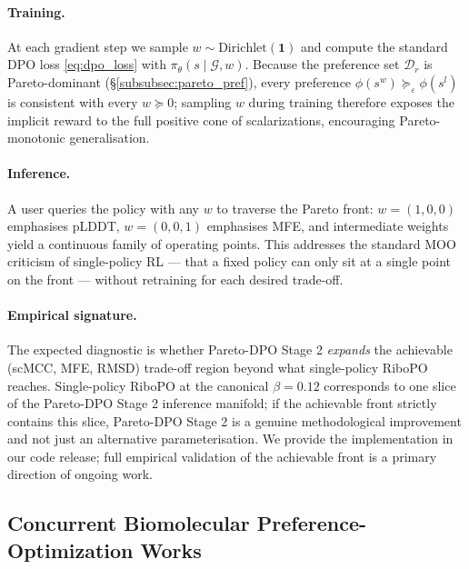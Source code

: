 {{\paragraph{Training.}
At each gradient step we sample $w \sim \mathrm{Dirichlet}(\mathbf{1})$ and compute the standard DPO loss \eqref{eq:dpo_loss} with $\pi_\theta(s\mid \mathcal{G}, w)$. Because the preference set $\mathcal{D}_r$ is Pareto-dominant (\S\ref{subsubsec:pareto_pref}), every preference $\phi(s^w) \succeq_\varepsilon \phi(s^l)$ is consistent with every $w \succeq 0$; sampling $w$ during training therefore exposes the implicit reward to the full positive cone of scalarizations, encouraging Pareto-monotonic generalisation.

\paragraph{Inference.}
A user queries the policy with any $w$ to traverse the Pareto front: $w = (1,0,0)$ emphasises pLDDT, $w = (0,0,1)$ emphasises MFE, and intermediate weights yield a continuous family of operating points. This addresses the standard MOO criticism of single-policy RL --- that a fixed policy can only sit at a single point on the front --- without retraining for each desired trade-off.

\paragraph{Empirical signature.}
The expected diagnostic is whether Pareto-DPO Stage 2 \emph{expands} the achievable (scMCC, MFE, RMSD) trade-off region beyond what single-policy RiboPO reaches. Single-policy RiboPO at the canonical $\beta=0.12$ corresponds to one slice of the Pareto-DPO Stage 2 inference manifold; if the achievable front strictly contains this slice, Pareto-DPO Stage 2 is a genuine methodological improvement and not just an alternative parameterisation. We provide the implementation in our code release; full empirical validation of the achievable front is a primary direction of ongoing work.


\subsection{Concurrent Biomolecular Preference-Optimization Works}
\label{app:concurrent}

}}
